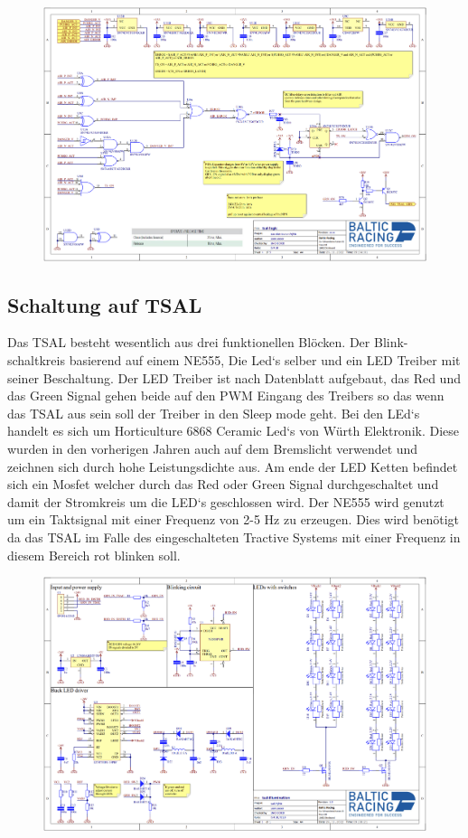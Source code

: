 \begin{figure}
	\centering
	\includegraphics[width=0.7\linewidth]{"bilder/TSAL Logik AMS Master"}
	\caption{}
	\label{fig:tsal-logik-ams-master}
\end{figure}

\FloatBarrier
\subsection{Schaltung auf TSAL}

Das TSAL besteht wesentlich aus drei funktionellen Blöcken. Der Blink-schaltkreis basierend auf einem NE555, Die Led`s selber und ein LED Treiber mit seiner Beschaltung. Der LED Treiber ist nach Datenblatt aufgebaut, das Red und das Green Signal gehen beide auf den PWM Eingang des Treibers so das wenn das TSAL aus sein soll der Treiber in den Sleep mode geht. Bei den LEd`s handelt es sich um Horticulture 6868 Ceramic Led`s von Würth Elektronik. Diese wurden in den vorherigen Jahren auch auf dem Bremslicht verwendet und zeichnen sich durch hohe Leistungsdichte aus. Am ende der LED Ketten befindet sich ein Mosfet welcher durch das Red oder Green Signal durchgeschaltet und damit der Stromkreis um die LED`s geschlossen wird. Der NE555 wird genutzt um ein Taktsignal mit einer Frequenz von 2-5 Hz zu erzeugen. Dies wird benötigt da das TSAL im Falle des eingeschalteten Tractive Systems mit einer Frequenz in diesem Bereich rot blinken soll.

\begin{figure}
	\centering
	\includegraphics[width=0.7\linewidth]{"bilder/Tsal Schematic"}
	\caption{}
	\label{fig:tsal-schematic}
\end{figure}

\FloatBarrier